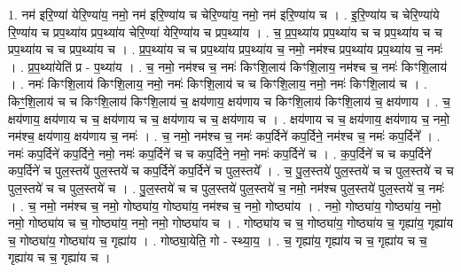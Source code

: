 \documentclass[17pt]{extarticle}
\begin{document}
1. नम॑ इरि॒ण्या॑ येरि॒ण्या॑य॒ नमो॒ नम॑ इरि॒ण्या॑य च चेरि॒ण्या॑य॒ नमो॒ नम॑ इरि॒ण्या॑य च । . इ॒रि॒ण्या॑य च चेरि॒ण्या॑ये रि॒ण्या॑य च प्रप॒थ्या॑य प्रप॒थ्या॑य चेरि॒ण्या॑ येरि॒ण्या॑य च प्रप॒थ्या॑य । . च॒ प्र॒प॒थ्या॑य प्रप॒थ्या॑य च च प्रप॒थ्या॑य च च प्रप॒थ्या॑य च च प्रप॒थ्या॑य च । . प्र॒प॒थ्या॑य च च प्रप॒थ्या॑य प्रप॒थ्या॑य च॒ नमो॒ नम॑श्च प्रप॒थ्या॑य प्रप॒थ्या॑य च॒ नमः॑ । . प्र॒प॒थ्या॑येति॑ प्र - प॒थ्या॑य । . च॒ नमो॒ नम॑श्च च॒ नमः॑ किꣳशि॒लाय॑ किꣳशि॒लाय॒ नम॑श्च च॒ नमः॑ किꣳशि॒लाय॑ । . नमः॑ किꣳशि॒लाय॑ किꣳशि॒लाय॒ नमो॒ नमः॑ किꣳशि॒लाय॑ च च किꣳशि॒लाय॒ नमो॒ नमः॑ किꣳशि॒लाय॑ च । . किꣳ॒॒शि॒लाय॑ च च किꣳशि॒लाय॑ किꣳशि॒लाय॑ च॒ क्षय॑णाय॒ क्षय॑णाय च किꣳशि॒लाय॑ किꣳशि॒लाय॑ च॒ क्षय॑णाय । . च॒ क्षय॑णाय॒ क्षय॑णाय च च॒ क्षय॑णाय च च॒ क्षय॑णाय च च॒ क्षय॑णाय च । . क्षय॑णाय च च॒ क्षय॑णाय॒ क्षय॑णाय च॒ नमो॒ नम॑श्च॒ क्षय॑णाय॒ क्षय॑णाय च॒ नमः॑ । . च॒ नमो॒ नम॑श्च च॒ नमः॑ कप॒र्दिने॑ कप॒र्दिने॒ नम॑श्च च॒ नमः॑ कप॒र्दिने᳚ । . नमः॑ कप॒र्दिने॑ कप॒र्दिने॒ नमो॒ नमः॑ कप॒र्दिने॑ च च कप॒र्दिने॒ नमो॒ नमः॑ कप॒र्दिने॑ च । . क॒प॒र्दिने॑ च च कप॒र्दिने॑ कप॒र्दिने॑ च पुल॒स्तये॑ पुल॒स्तये॑ च कप॒र्दिने॑ कप॒र्दिने॑ च पुल॒स्तये᳚ । . च॒ पु॒ल॒स्तये॑ पुल॒स्तये॑ च च पुल॒स्तये॑ च च पुल॒स्तये॑ च च पुल॒स्तये॑ च । . पु॒ल॒स्तये॑ च च पुल॒स्तये॑ पुल॒स्तये॑ च॒ नमो॒ नम॑श्च पुल॒स्तये॑ पुल॒स्तये॑ च॒ नमः॑ । . च॒ नमो॒ नम॑श्च च॒ नमो॒ गोष्ठ्या॑य॒ गोष्ठ्या॑य॒ नम॑श्च च॒ नमो॒ गोष्ठ्या॑य । . नमो॒ गोष्ठ्या॑य॒ गोष्ठ्या॑य॒ नमो॒ नमो॒ गोष्ठ्या॑य च च॒ गोष्ठ्या॑य॒ नमो॒ नमो॒ गोष्ठ्या॑य च । . गोष्ठ्या॑य च च॒ गोष्ठ्या॑य॒ गोष्ठ्या॑य च॒ गृह्या॑य॒ गृह्या॑य च॒ गोष्ठ्या॑य॒ गोष्ठ्या॑य च॒ गृह्या॑य । . गोष्ठ्या॒येति॒ गो - स्थ्या॒य॒ । . च॒ गृह्या॑य॒ गृह्या॑य च च॒ गृह्या॑य च च॒ गृह्या॑य च च॒ गृह्या॑य च । \newline
\end{document}
